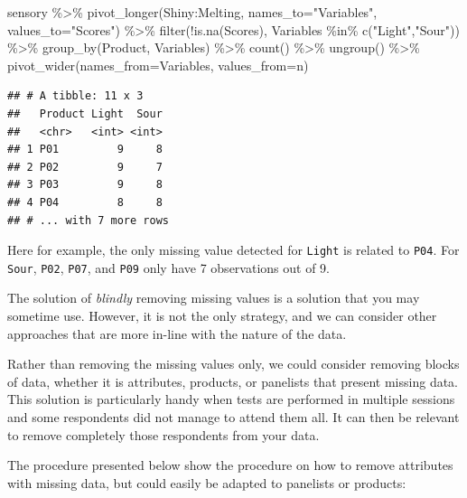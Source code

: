 \documentclass[
]{krantz}
\makeatletter
\newenvironment{Shaded}{\begin{snugshade}}{\end{snugshade}}
\newcommand{\AttributeTok}[1]{\textcolor[rgb]{0.61,0.61,0.61}{#1}}
\newcommand{\FunctionTok}[1]{\textcolor[rgb]{0,0,0}{#1}}
\newcommand{\NormalTok}[1]{#1}
\newcommand{\SpecialCharTok}[1]{\textcolor[rgb]{0,0,0}{#1}}
\newcommand{\StringTok}[1]{\textcolor[rgb]{0.5,0.5,0.5}{#1}}
\newenvironment{kframe}{%
\medskip{}
\setlength{\fboxsep}{.8em}
 \def\at@end@of@kframe{}%
 \ifinner\ifhmode%
  \def\at@end@of@kframe{\end{minipage}}%
  \begin{minipage}{\columnwidth}%
 \fi\fi%
 \def\FrameCommand##1{\hskip\@totalleftmargin \hskip-\fboxsep
 \colorbox{shadecolor}{##1}\hskip-\fboxsep
     \hskip-\linewidth \hskip-\@totalleftmargin \hskip\columnwidth}%
 \MakeFramed {\advance\hsize-\width
   \@totalleftmargin\z@ \linewidth\hsize
   \@setminipage}}%
 {\par\unskip\endMakeFramed%
 \at@end@of@kframe}
\renewenvironment{Shaded}{\begin{kframe}}{\end{kframe}}
\makeatother
\begin{document}
\begin{Shaded}
\begin{Highlighting}[]
\NormalTok{sensory }\SpecialCharTok{\%\textgreater{}\%} 
  \FunctionTok{pivot\_longer}\NormalTok{(Shiny}\SpecialCharTok{:}\NormalTok{Melting, }\AttributeTok{names\_to=}\StringTok{"Variables"}\NormalTok{, }\AttributeTok{values\_to=}\StringTok{"Scores"}\NormalTok{) }\SpecialCharTok{\%\textgreater{}\%} 
  \FunctionTok{filter}\NormalTok{(}\SpecialCharTok{!}\FunctionTok{is.na}\NormalTok{(Scores),}
\NormalTok{         Variables }\SpecialCharTok{\%in\%} \FunctionTok{c}\NormalTok{(}\StringTok{"Light"}\NormalTok{,}\StringTok{"Sour"}\NormalTok{)) }\SpecialCharTok{\%\textgreater{}\%}
  \FunctionTok{group\_by}\NormalTok{(Product, Variables) }\SpecialCharTok{\%\textgreater{}\%} 
  \FunctionTok{count}\NormalTok{() }\SpecialCharTok{\%\textgreater{}\%} 
  \FunctionTok{ungroup}\NormalTok{() }\SpecialCharTok{\%\textgreater{}\%} 
  \FunctionTok{pivot\_wider}\NormalTok{(}\AttributeTok{names\_from=}\NormalTok{Variables, }\AttributeTok{values\_from=}\NormalTok{n)}
\end{Highlighting}
\end{Shaded}

\begin{verbatim}
## # A tibble: 11 x 3
##   Product Light  Sour
##   <chr>   <int> <int>
## 1 P01         9     8
## 2 P02         9     7
## 3 P03         9     8
## 4 P04         8     8
## # ... with 7 more rows
\end{verbatim}

Here for example, the only missing value detected for \texttt{Light} is related to \texttt{P04}. For \texttt{Sour}, \texttt{P02}, \texttt{P07}, and \texttt{P09} only have 7 observations out of 9.

The solution of \emph{blindly} removing missing values is a solution that you may sometime use. However, it is not the only strategy, and we can consider other approaches that are more in-line with the nature of the data.

Rather than removing the missing values only, we could consider removing blocks of data, whether it is attributes, products, or panelists that present missing data. This solution is particularly handy when tests are performed in multiple sessions and some respondents did not manage to attend them all. It can then be relevant to remove completely those respondents from your data.

The procedure presented below show the procedure on how to remove attributes with missing data, but could easily be adapted to panelists or products:
\end{document}
